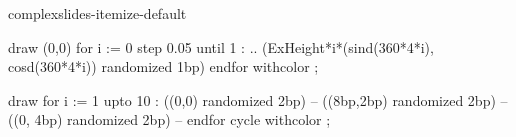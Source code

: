 \startmodule complexslides-itemize-default

  draw (0,0)
    for i := 0 step 0.05 until 1 :
      .. (ExHeight*i*(sind(360*4*i), cosd(360*4*i)) randomized 1bp)
    endfor
      withcolor  ;
\stopuseMPgraphic

  draw
  for i := 1 upto 10 :
    ((0,0) randomized 2bp) --
    ((8bp,2bp) randomized 2bp) --
    ((0, 4bp) randomized 2bp) --
  endfor cycle withcolor  ;
\stopuseMPgraphic

\setupitemize[color=foreground:1,
              headstyle=\tfa,
              headcolor=foreground:1]

\setupitemize[autointro]

\setupitemize[2][headstyle=bold,headcolor=]


\setupitemize[itemalign=flushright,distance=0.5em]

\stopmodule
